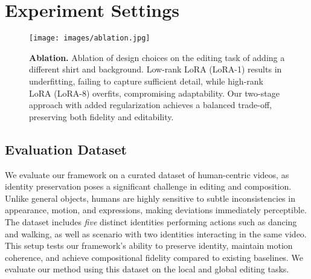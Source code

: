 \section{Experiment Settings}








\begin{figure}[t!]
        \centering
        \texttt{[image: images/ablation.jpg]}
        \caption{\textbf{Ablation.} Ablation of design choices on the editing task of adding a different shirt and background. Low-rank LoRA (LoRA-1) results in underfitting, failing to capture sufficient detail, while high-rank LoRA (LoRA-8) overfits, compromising adaptability. Our two-stage approach with added regularization achieves a balanced trade-off, preserving both fidelity and editability.}
        \label{fig:ablation}
    \end{figure}






\subsection{Evaluation Dataset} We evaluate our framework on a curated dataset of human-centric videos, as identity preservation poses a significant challenge in editing and composition. Unlike general objects, humans are highly sensitive to subtle inconsistencies in appearance, motion, and expressions, making deviations immediately perceptible. The dataset includes \textit{five} distinct identities performing actions such as dancing and walking, as well as scenario with two identities interacting in the same video. This setup tests our framework’s ability to preserve identity, maintain motion coherence, and achieve compositional fidelity compared to existing baselines. We evaluate our method using this dataset on the local and global editing tasks.

